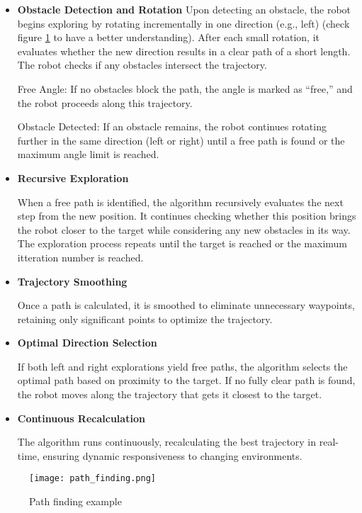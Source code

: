 \begin{itemize}
    \item \textbf{Obstacle Detection and Rotation}
    Upon detecting an obstacle, the robot begins exploring by rotating incrementally in one direction (e.g., left) (check figure \ref{fig:path_finding} to have a better understanding). After each small rotation, it evaluates whether the new direction results in a clear path of a short length. The robot checks if any obstacles intersect the trajectory.

    Free Angle: If no obstacles block the path, the angle is marked as “free,” and the robot proceeds along this trajectory.

    Obstacle Detected: If an obstacle remains, the robot continues rotating further in the same direction (left or right) until a free path is found or the maximum angle limit is reached.

    \item \textbf{Recursive Exploration}

    When a free path is identified, the algorithm recursively evaluates the next step from the new position. It continues checking whether this position brings the robot closer to the target while considering any new obstacles in its way. The exploration process repeats until the target is reached or the maximum itteration number is reached.

    \item \textbf{Trajectory Smoothing}

    Once a path is calculated, it is smoothed to eliminate unnecessary waypoints, retaining only significant points to optimize the trajectory.

    \item \textbf{Optimal Direction Selection}

    If both left and right explorations yield free paths, the algorithm selects the optimal path based on proximity to the target. If no fully clear path is found, the robot moves along the trajectory that gets it closest to the target.

    \item \textbf{Continuous Recalculation}

    The algorithm runs continuously, recalculating the best trajectory in real-time, ensuring dynamic responsiveness to changing environments.
\end{itemize}

\begin{figure}
    \centering
    \texttt{[image: path\_finding.png]}
    \caption{Path finding example}
    \label{fig:path_finding}
\end{figure}

